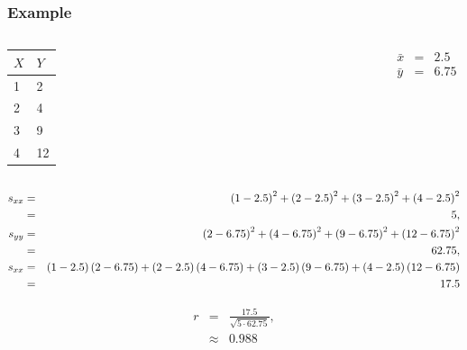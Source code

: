 \begin{frame}
  \frametitle{Example}
  \vspace*{-1em}
  \begin{columns}

    \begin{tabular}{l|l}
      $X$ & $Y$ \\ \hline
      1 & 2 \\
      2 & 4  \\
      3 & 9 \\
      4 & 12
    \end{tabular}


    \vfill


    {
      \begin{eqnarray*}
        \bar{x} & = & 2.5 \\
        \bar{y} & = & 6.75
      \end{eqnarray*}
    }

    \vfill

  \end{columns}

  {
    \begin{eqnarray*}
      s_{xx} & = & \left( 1-2.5\right)^2 + \left( 2 - 2.5 \right)^2 + \left( 3 - 2.5 \right)^2 + \left( 4 - 2.5 \right)^2 \\
            & = & 5, \\
      s_{yy} & = & \left( 2-6.75\right)^2 + \left( 4 - 6.75 \right)^2 + \left( 9 - 6.75 \right)^2 + \left( 12 - 6.75 \right)^2 \\
            & = & 62.75, \\
      s_{xx} & = & \left( 1-2.5\right)\left( 2-6.75\right) + \left( 2 - 2.5 \right)\left( 4 - 6.75 \right) + \left( 3 - 2.5 \right)\left( 9 - 6.75 \right) + \left( 4 - 2.5 \right)\left( 12 - 6.75 \right) \\
            & = & 17.5
    \end{eqnarray*}
  } 

  {
    \begin{eqnarray*}
      r & = & \frac{17.5}{\sqrt{5\cdot 62.75}}, \\
        & \approx & 0.988
    \end{eqnarray*}
  }


\end{frame}



